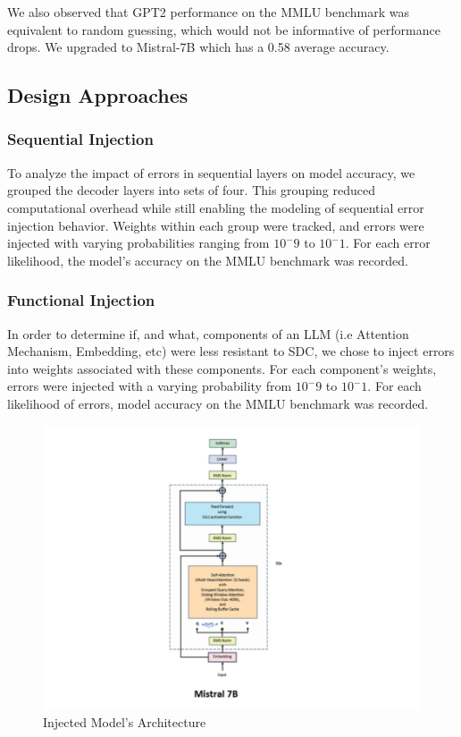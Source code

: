 We also observed that GPT2 performance on the MMLU benchmark was equivalent to random guessing, which would not be informative of performance drops. We upgraded to Mistral-7B which has a 0.58 average accuracy.

\subsection{Design Approaches}
\subsubsection{Sequential Injection} 
To analyze the impact of errors in sequential layers on model accuracy, we grouped the decoder layers into sets of four. This grouping reduced computational overhead while still enabling the modeling of sequential error injection behavior. Weights within each group were tracked, and errors were injected with varying probabilities ranging from $10^-9$ to $10^-1$. For each error likelihood, the model’s accuracy on the MMLU benchmark was recorded.

\subsubsection{Functional Injection} 
In order to determine if, and what, components of an LLM (i.e Attention Mechanism, Embedding, etc) were less resistant to SDC, we chose to inject errors into weights associated with these components. For each component's weights, errors were injected with a varying probability from $10^-9$ to $10^-1$. For each likelihood of errors, model accuracy on the MMLU benchmark was recorded.

\begin{figure}
    \centering
    \includegraphics[width=1\linewidth]{images/Mistral-7B-Arch.png}
    \caption{Injected Model's Architecture}
    \label{fig:enter-label}
\end{figure}